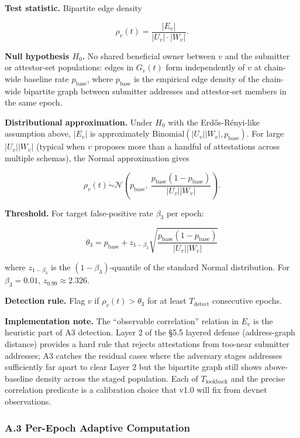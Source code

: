 \documentclass[
  11pt,
]{article}
\begin{document}
\textbf{Test statistic.} Bipartite edge density

\[\rho_v(t) = \frac{|E_v|}{|U_v| \cdot |W_v|}.\]

\textbf{Null hypothesis \(H_0\).} No shared beneficial owner between
\(v\) and the submitter or attestor-set populations: edges in \(G_v(t)\)
form independently of \(v\) at chain-wide baseline rate
\(p_{\text{base}}\), where \(p_{\text{base}}\) is the empirical edge
density of the chain-wide bipartite graph between submitter addresses
and attestor-set members in the same epoch.

\textbf{Distributional approximation.} Under \(H_0\) with the
Erdős-Rényi-like assumption above, \(|E_v|\) is approximately
\(\text{Binomial}(|U_v||W_v|, p_{\text{base}})\). For large
\(|U_v||W_v|\) (typical when \(v\) proposes more than a handful of
attestations across multiple schemas), the Normal approximation gives

\[\rho_v(t) \mathrel{\dot\sim} \mathcal{N}\!\left(p_{\text{base}},\ \frac{p_{\text{base}}(1 - p_{\text{base}})}{|U_v||W_v|}\right).\]

\textbf{Threshold.} For target false-positive rate \(\beta_3\) per
epoch:

\[\theta_3 = p_{\text{base}} + z_{1-\beta_3} \sqrt{\frac{p_{\text{base}}(1 - p_{\text{base}})}{|U_v||W_v|}}\]

where \(z_{1-\beta_3}\) is the \((1-\beta_3)\)-quantile of the standard
Normal distribution. For \(\beta_3 = 0.01\), \(z_{0.99} \approx 2.326\).

\textbf{Detection rule.} Flag \(v\) if \(\rho_v(t) > \theta_3\) for at
least \(T_{\text{detect}}\) consecutive epochs.

\textbf{Implementation note.} The ``observable correlation'' relation in
\(E_v\) is the heuristic part of A3 detection. Layer 2 of the §5.5
layered defense (address-graph distance) provides a hard rule that
rejects attestations from too-near submitter addresses; A3 catches the
residual cases where the adversary stages addresses sufficiently far
apart to clear Layer 2 but the bipartite graph still shows
above-baseline density across the staged population. Each of
\(T_{\text{lookback}}\) and the precise correlation predicate is a
calibration choice that v1.0 will fix from devnet observations.

\subsubsection{A.3 Per-Epoch Adaptive
Computation}\label{a.3-per-epoch-adaptive-computation}
\end{document}
